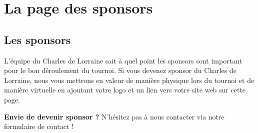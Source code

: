 \section{La page des sponsors}

\subsection{Les sponsors}

L'équipe du Charles de Lorraine sait à quel point les sponsors sont important
pour le bon déroulement du tournoi. Si vous devenez sponsor du Charles de
Lorraine, nous vous mettrons en valeur de manière physique lors du tournoi et
de manière virtuelle en ajoutant votre logo et un lien vers votre site web sur
cette page. \newline

\textbf{Envie de devenir sponsor ?} N'hésitez pas à nous contacter via notre
formulaire de contact ! \newline

